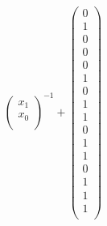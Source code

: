 \begin{align*}
\begin{pmatrix}
x_{1} \\
x_{0} \\
\end{pmatrix}^{-1}
+
\begin{pmatrix}
0 \\
1 \\
0 \\
0 \\
0 \\ 
1 \\
0 \\
1 \\
1 \\
0 \\
1 \\
1 \\
0 \\ 
1 \\
1 \\
1 \\
\end{pmatrix}
\end{align*}

